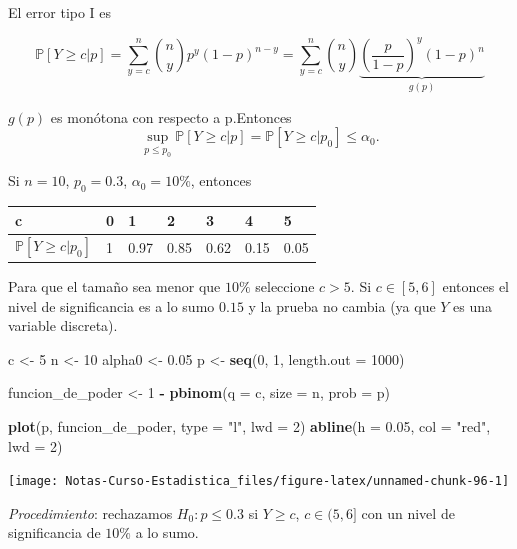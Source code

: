 \documentclass[
  12pt,
]{book}
\newenvironment{Shaded}{\begin{snugshade}}{\end{snugshade}}
\newcommand{\DataTypeTok}[1]{\textcolor[rgb]{0.13,0.29,0.53}{#1}}
\newcommand{\DecValTok}[1]{\textcolor[rgb]{0.00,0.00,0.81}{#1}}
\newcommand{\FloatTok}[1]{\textcolor[rgb]{0.00,0.00,0.81}{#1}}
\newcommand{\KeywordTok}[1]{\textcolor[rgb]{0.13,0.29,0.53}{\textbf{#1}}}
\newcommand{\NormalTok}[1]{#1}
\newcommand{\OperatorTok}[1]{\textcolor[rgb]{0.81,0.36,0.00}{\textbf{#1}}}
\newcommand{\StringTok}[1]{\textcolor[rgb]{0.31,0.60,0.02}{#1}}
\begin{document}
El error tipo I es

\[\mathbb P[Y\geq c|p] = \sum_{y=c}^n{n\choose y}p^y(1-p)^{n-y} = \sum_{y=c}^n{n\choose y} \underbrace{\left(\dfrac p{1-p}\right)^y(1-p)^n}_{g(p)}\]

\(g(p)\) es monótona con respecto a p.Entonces
\[\sup_{p\leq p_0} \mathbb P[Y\geq c|p] = \mathbb P [Y\geq c|p_0] \leq \alpha_0.\]

Si \(n=10\), \(p_0 = 0.3\), \(\alpha_0 = 10\%\), entonces

\begin{longtable}[]{@{}lllllll@{}}
\toprule
c & 0 & 1 & 2 & 3 & 4 & 5\tabularnewline
\midrule
\endhead
\(\mathbb P[Y\geq c|p_0]\) & 1 & 0.97 & 0.85 & 0.62 & 0.15 & 0.05\tabularnewline
\bottomrule
\end{longtable}

Para que el tamaño sea menor que \(10\%\) seleccione \(c>5\). Si \(c\in [5,6]\)
entonces el nivel de significancia es a lo sumo \(0.15\) y la prueba no cambia (ya
que \(Y\) es una variable discreta).

\begin{Shaded}
\begin{Highlighting}[]
\NormalTok{c \textless{}{-}}\StringTok{ }\DecValTok{5}
\NormalTok{n \textless{}{-}}\StringTok{ }\DecValTok{10}
\NormalTok{alpha0 \textless{}{-}}\StringTok{ }\FloatTok{0.05}
\NormalTok{p \textless{}{-}}\StringTok{ }\KeywordTok{seq}\NormalTok{(}\DecValTok{0}\NormalTok{, }\DecValTok{1}\NormalTok{, }\DataTypeTok{length.out =} \DecValTok{1000}\NormalTok{)}

\NormalTok{funcion\_de\_poder \textless{}{-}}\StringTok{ }\DecValTok{1} \OperatorTok{{-}}\StringTok{ }\KeywordTok{pbinom}\NormalTok{(}\DataTypeTok{q =}\NormalTok{ c, }\DataTypeTok{size =}\NormalTok{ n, }\DataTypeTok{prob =}\NormalTok{ p)}

\KeywordTok{plot}\NormalTok{(p, funcion\_de\_poder, }\DataTypeTok{type =} \StringTok{"l"}\NormalTok{, }\DataTypeTok{lwd =} \DecValTok{2}\NormalTok{)}
\KeywordTok{abline}\NormalTok{(}\DataTypeTok{h =} \FloatTok{0.05}\NormalTok{, }\DataTypeTok{col =} \StringTok{"red"}\NormalTok{, }\DataTypeTok{lwd =} \DecValTok{2}\NormalTok{)}
\end{Highlighting}
\end{Shaded}

\begin{center}\texttt{[image: Notas-Curso-Estadistica\_files/figure-latex/unnamed-chunk-96-1]} \end{center}

\emph{Procedimiento}: rechazamos \(H_0: p \leq 0.3\) si \(Y\geq c\), \(c\in(5,6]\) con un
nivel de significancia de \(10\%\) a lo sumo.
\end{document}
